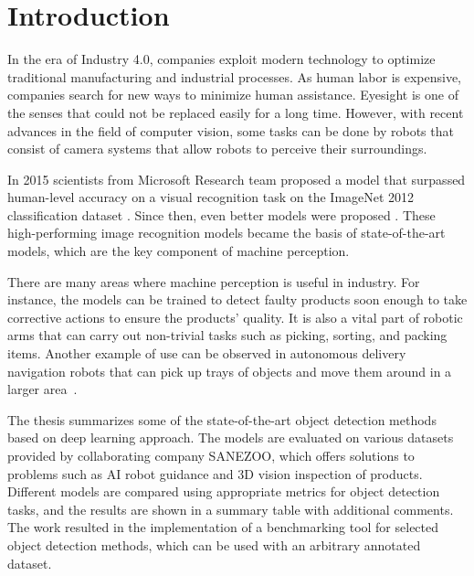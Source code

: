 \chapter{Introduction}

In the era of Industry 4.0, companies exploit modern technology to optimize traditional manufacturing and industrial processes. As human labor is expensive, companies search for new ways to minimize human assistance. Eyesight is one of the senses that could not be replaced easily for a long time. However, with recent advances in the field of computer vision, some tasks can be done by robots that consist of camera systems that allow robots to perceive their surroundings. 

In 2015 scientists from Microsoft Research team proposed a  model that surpassed human-level accuracy on a visual recognition task on the ImageNet 2012 classification dataset \cite{surp2015}. Since then, even better models were proposed \cite{resnet, efficientnet}. These high-performing image recognition models became the basis of state-of-the-art  models, which are the key component of machine perception.

There are many areas where machine perception is useful in industry. For instance, the models can be trained to detect faulty products soon enough to take corrective actions to ensure the products' quality. It is also a vital part of robotic arms that can carry out non-trivial tasks such as picking, sorting, and packing items. Another example of use can be observed in autonomous delivery navigation robots that can pick up trays of objects and move them around in a larger area~\cite{bmw}. 

The thesis summarizes some of the state-of-the-art object detection methods based on deep learning approach. The models are evaluated on various datasets provided by collaborating company SANEZOO, which offers solutions to problems such as AI robot guidance and 3D vision inspection of products. Different models are compared using appropriate metrics for object detection tasks, and the results are shown in a summary table with additional comments. The work resulted in the implementation of a benchmarking tool for selected object detection methods, which can be used with an arbitrary annotated dataset.